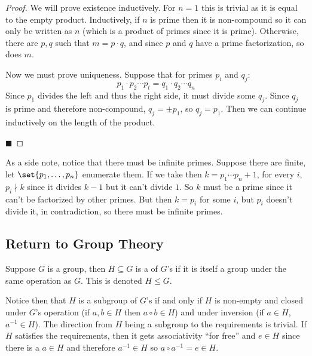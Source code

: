 \documentclass[10pt]{article}
\begin{document}
\begin{proof}

    We will prove existence inductively.
    For $n=1$ this is trivial as it is equal to the empty product.
    Inductively, if $n$ is prime then it is non-compound so it can only be written as $n$ (which is a product of primes since it is prime).
    Otherwise, there are $p,q$ such that $m=p\cdot q$, and since $p$ and $q$ have a prime factorization, so does $m$.

    Now we must prove uniqueness.
    Suppose that for primes $p_i$ and $q_j$:
    \[ p_1\cdot p_2\cdots p_t = q_1\cdot q_2\cdots q_n \]
    Since $p_1$ divides the left and thus the right side, it must divide some $q_j$.
    Since $q_j$ is prime and therefore non-compound, $q_j=\pm p_1$, so $q_j=p_1$.
    Then we can continue inductively on the length of the product.

    \hfill$\blacksquare$

\end{proof}

As a side note, notice that there must be infinite primes.
Suppose there are finite, let $\set{p_1,\dots,p_n}$ enumerate them.
If we take then $k=p_1\cdots p_n+1$, for every $i$, $p_i\mathrel{\nmid}k$ since it divides $k-1$ but it can't divide $1$.
So $k$ must be a prime since it can't be factorized by other primes.
But then $k=p_i$ for some $i$, but $p_i$ doesn't divide it, in contradiction, so there must be infinite primes.

\subsection{Return to Group Theory}

\begin{defn*}

    Suppose $G$ is a group, then $H\subseteq G$ is a  of $G$'s if it is itself a group under the same operation as $G$.
    This is denoted $H\leq G$.

\end{defn*}

Notice then that $H$ is a subgroup of $G$'s if and only if $H$ is non-empty and closed under $G$'s operation (if $a,b\in H$ then $a\circ b\in H$) and under inversion
(if $a\in H$, $a^{-1}\in H$).
The direction from $H$ being a subgroup to the requirements is trivial.
If $H$ satisfies the requirements, then it gets associativity ``for free'' and $e\in H$ since there is a $a\in H$ and therefore $a^{-1}\in H$ so $a\circ a^{-1}=e\in H$.
\end{document}
